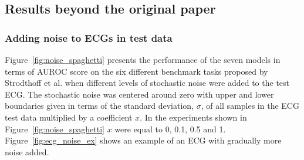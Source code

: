 \subsection{Results beyond the original paper}

\subsubsection{Adding noise to ECGs in test data}
Figure~\ref{fig:noise_spaghetti} presents the performance of the seven models in terms of AUROC score on the six different benchmark tasks proposed by Strodthoff et al. when different levels of stochastic noise were added to the test ECG. The stochastic noise was centered around zero with upper and lower boundaries given in terms of the standard deviation, $\sigma$, of all samples in the ECG test data multiplied by a coefficient $x$. In the experiments shown in Figure~\ref{fig:noise_spaghetti} $x$ were equal to 0, 0.1, 0.5 and 1. Figure~\ref{fig:ecg_noise_ex} shows an example of an ECG with gradually more noise added.
